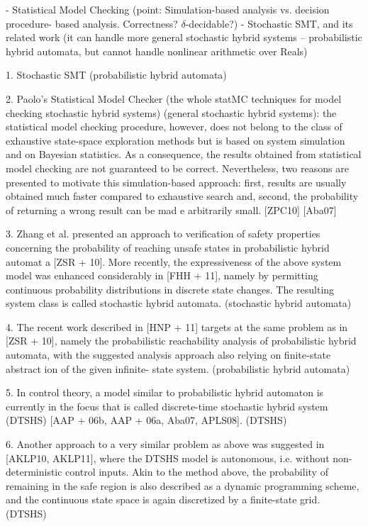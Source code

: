 \documentclass[runningheads,a4paper]{llncs}
\begin{document}
- Statistical Model Checking (point: Simulation-based analysis vs. decision procedure- based analysis. Correctness? $\delta$-decidable?)
- Stochastic SMT, and its related work (it can handle more general stochastic hybrid systems – probabilistic hybrid automata, but cannot handle nonlinear arithmetic over Reals)

1. Stochastic SMT (probabilistic hybrid automata)

2. Paolo's Statistical Model Checker (the whole statMC techniques for model checking stochastic hybrid systems) (general stochastic hybrid systems): the statistical model checking procedure, however, does not belong to the class of exhaustive state-space exploration methods but is based on system simulation and on Bayesian statistics. As a consequence, the results obtained from statistical model checking are not guaranteed to be correct. Nevertheless, two reasons are presented to motivate this simulation-based approach: first, results are usually obtained much faster compared to exhaustive search and, second, the probability of returning a wrong result can be mad e arbitrarily small. [ZPC10] [Aba07] 

3. Zhang et al. presented an approach to verification of safety properties concerning the probability of reaching unsafe states in probabilistic hybrid automat a [ZSR + 10]. More recently, the expressiveness of the above system model was enhanced considerably in [FHH + 11], namely by permitting continuous probability distributions in discrete state changes. The resulting system class is called stochastic hybrid automata. (stochastic hybrid automata)

4. The recent work described in [HNP + 11] targets at the same problem as in [ZSR + 10], namely the probabilistic reachability analysis of probabilistic hybrid automata, with the suggested analysis approach also relying on finite-state abstract ion of the given infinite- state system. (probabilistic hybrid automata)

5. In control theory, a model similar to probabilistic hybrid automaton is currently in the focus that is called discrete-time stochastic hybrid system (DTSHS) [AAP + 06b, AAP + 06a, Aba07, APLS08]. (DTSHS)

6. Another approach to a very similar problem as above was suggested in [AKLP10, AKLP11], where the DTSHS model is autonomous, i.e. without non-deterministic control inputs. Akin to the method above, the probability of remaining in the safe region is also described as a dynamic programming scheme, and the continuous state space is again discretized by a finite-state grid. (DTSHS)
\end{document}
